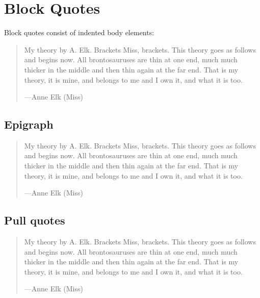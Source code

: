 \documentclass[a4paper,10pt,english]{sphinxmanual}
\begin{document}
\section{Block Quotes}
\label{\detokenize{test1:block-quotes}}
\sphinxAtStartPar
Block quotes consist of indented body elements:
\begin{quote}

\sphinxAtStartPar
My theory by A. Elk.  Brackets Miss, brackets.  This theory goes
as follows and begins now.  All brontosauruses are thin at one
end, much much thicker in the middle and then thin again at the
far end.  That is my theory, it is mine, and belongs to me and I
own it, and what it is too.

\begin{flushright}
---Anne Elk (Miss)
\end{flushright}
\end{quote}


\subsection{Epigraph}
\label{\detokenize{test1:epigraph}}
\sphinxAtStartPar
{}
\begin{quote}

\sphinxAtStartPar
My theory by A. Elk.  Brackets Miss, brackets.  This theory goes
as follows and begins now.  All brontosauruses are thin at one
end, much much thicker in the middle and then thin again at the
far end.  That is my theory, it is mine, and belongs to me and I
own it, and what it is too.

\begin{flushright}
---Anne Elk (Miss)
\end{flushright}
\end{quote}


\subsection{Pull quotes}
\label{\detokenize{test1:pull-quotes}}
\sphinxAtStartPar
{}
\begin{quote}

\sphinxAtStartPar
My theory by A. Elk.  Brackets Miss, brackets.  This theory goes
as follows and begins now.  All brontosauruses are thin at one
end, much much thicker in the middle and then thin again at the
far end.  That is my theory, it is mine, and belongs to me and I
own it, and what it is too.

\begin{flushright}
---Anne Elk (Miss)
\end{flushright}
\end{quote}
\end{document}
